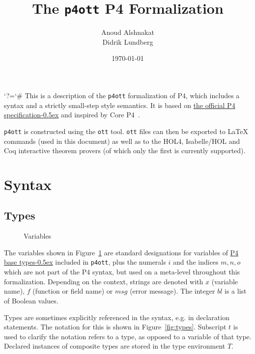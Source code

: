 \documentclass[UTF8]{article}
\title{%
The \texttt{p4ott} P4 Formalization}
\author{Anoud Alshnakat\\
Didrik Lundberg
}
\date{\today}
\begin{document}
\maketitle

\newcommand{\pfott}{\texttt{p4ott}}

\begingroup\lccode`?=`# \lowercase{\endgroup
\newcommand{\specsec}[1]{%
    ?#1%
}
}
\newcommand{\pfourspec}[2]{%
\href{https://p4lang.github.io/p4-spec/docs/P4-16-v1.2.2.html\specsec{#1}}{#2\kern-0.5ex} %
}
\noindent
This is a description of the \pfott{} formalization of P4, which includes a syntax and a strictly small-step style semantics. It is based on \pfourspec{}{the official P4 specification} and inspired by Core P4~\cite{doenges2021petr4}.

\pfott{} is constructed using the \texttt{ott} tool. \texttt{ott} files can then be exported to \LaTeX{} commands (used in this document) as well as to the HOL4, Isabelle/HOL and Coq interactive theorem provers (of which only the first is currently supported).

\section{Syntax}
\subsection{Types}
\newcommand{\num}{\ensuremath{i}}
\newcommand{\vn}{\ensuremath{x}}
\newcommand{\msg}{\ensuremath{\mathit{msg}}}
\newcommand{\fn}{\ensuremath{f}}
\newcommand{\inte}{\ensuremath{bl}}
%
%
\begin{figure}[h!]
\centering
\ottmetavars
\caption{Variables}
\label{fig:vars}
\end{figure}

The variables shown in Figure~\ref{fig:vars} are standard designations for variables of \pfourspec{sec-base-types}{P4 base types} included in \pfott{}, plus the numerals \num{} and the indices $m, n, o$ which are not part of the P4 syntax, but used on a meta-level throughout this formalization. Depending on the context, strings are denoted with \vn{} (variable name), \fn{} (function or field name) or \msg{} (error message). The integer \inte{} is a list of Boolean values.

Types are sometimes explicitly referenced in the syntax, e.g. in declaration statements. The notation for this is shown in Figure~\ref{fig:types}. Subscript $t$ is used to clarify the notation refers to a type, as opposed to a variable of that type. Declared instances of composite types are stored in the type environment $T$.
\end{document}
